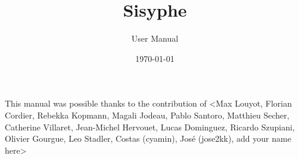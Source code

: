 \documentclass[Sisyphe]{../../data/TelemacDoc} %
\begin{document}
\let\cleardoublepage\clearpage

\setlength\parindent{0pt}

\title{Sisyphe}
\subtitle{User Manual}
\version{\telmaversion}
\date{\today}
\maketitle
\clearpage



\newpage

\thispagestyle{empty}

\TelemacCopyright{}




\pagestyle{empty} %

\tableofcontents%


\pagestyle{fancy} %

\pagebreak
This manual was possible thanks to the contribution of <Max Louyot, Florian Cordier, Rebekka Kopmann, Magali Jodeau, Pablo Santoro, Matthieu Secher, Catherine Villaret, Jean-Michel Hervouet, Lucas Dominguez, Ricardo Szupiani, Olivier Gourgue, Leo Stadler, Costas (cyamin), Jos\'e (jose2kk), add your name here>
\pagebreak



\end{document}

